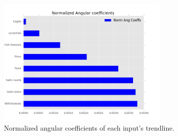\begin{figure}[H]
	\centering
    \includegraphics[width=0.75\textwidth]{Files/Norm_Ang_Coeffs.jpg}
    \caption{Normalized angular coefficients of each input's trendline.}
\end{figure}

